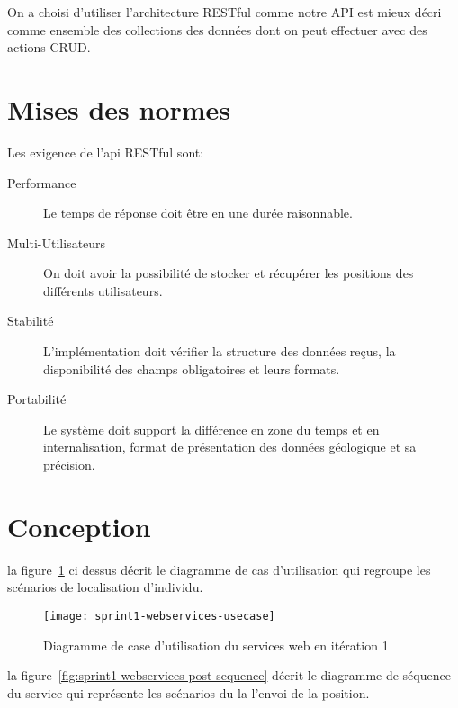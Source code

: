 On a choisi d'utiliser l'architecture RESTful comme notre API est mieux décri
comme ensemble des collections des données dont on peut effectuer avec des
actions CRUD\@.

\section{Mises des normes}

Les exigence de l'api RESTful sont:

\begin{description}
    \item [Performance] Le temps de réponse doit être en une durée raisonnable.
    \item [Multi-Utilisateurs] On doit avoir la possibilité de stocker et
        récupérer les positions des différents utilisateurs.
    \item [Stabilité] L'implémentation doit vérifier la structure des données
        reçus, la disponibilité des champs obligatoires et leurs formats.
    \item [Portabilité] Le système doit support la différence en zone du temps
        et en internalisation, format de présentation des données géologique et
        sa précision.
\end{description}


\section{Conception}
la figure~\ref{fig:sprint1-webservices-usecase}  ci dessus décrit
le diagramme de cas
d'utilisation qui regroupe les scénarios de localisation d'individu.

\begin{figure}[htbp]
    \centering
    \texttt{[image: sprint1-webservices-usecase]}
    \caption{Diagramme de case d'utilisation du services web en itération 1}
\label{fig:sprint1-webservices-usecase}
\end{figure}

la figure~\ref{fig:sprint1-webservices-post-sequence} décrit le diagramme de
séquence du service  qui représente les scénarios du la
l'envoi de la position.

